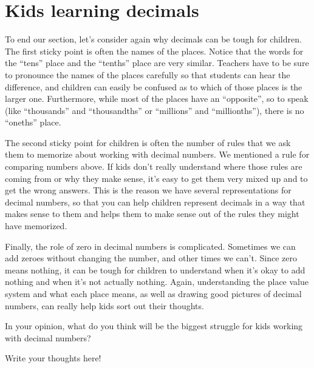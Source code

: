 \documentclass{ximera}
\begin{document}
\section{Kids learning decimals}

To end our section, let's consider again why decimals can be tough for children. The first sticky point is often the names of the places. Notice that the words for the ``tens'' place and the ``tenths'' place are very similar. Teachers have to be sure to pronounce the names of the places carefully so that students can hear the difference, and children can easily be confused as to which of those places is the larger one. Furthermore, while most of the places have an ``opposite'', so to speak (like ``thousands'' and ``thousandths'' or ``millions'' and ``millionths''), there is no ``oneths'' place. 

The second sticky point for children is often the number of rules that we ask them to memorize about working with decimal numbers. We mentioned a rule for comparing numbers above. If kids don't really understand where those rules are coming from or why they make sense, it's easy to get them very mixed up and to get the wrong answers. This is the reason we have several representations for decimal numbers, so that you can help children represent decimals in a way that makes sense to them and helps them to make sense out of the rules they might have memorized.

Finally, the role of zero in decimal numbers is complicated. Sometimes we can add zeroes without changing the number, and other times we can't. Since zero means nothing, it can be tough for children to understand when it's okay to add nothing and when it's not actually nothing. Again, understanding the place value system and what each place means, as well as drawing good pictures of decimal numbers, can really help kids sort out their thoughts.

\begin{question}
In your opinion, what do you think will be the biggest struggle for kids working with decimal numbers?
\begin{freeResponse}
Write your thoughts here!
\end{freeResponse}
\end{question}
\end{document}
